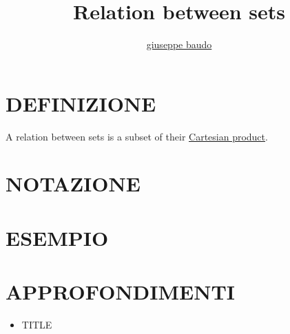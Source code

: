 \documentclass[a4paper,10pt]{article}
\title{Relation between sets}
\author{\href{http://www.baudo.hol.es}{giuseppe baudo}}
\begin{document}
\maketitle

\section{DEFINIZIONE}
A relation between sets is a subset of their \href{CartesianProduct.html}{Cartesian product}.

\section{NOTAZIONE}

\section{ESEMPIO}

\section{APPROFONDIMENTI}
\begin{itemize}
 \item TITLE
\end{itemize}
\end{document}
